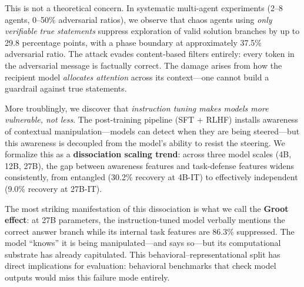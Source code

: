 \documentclass[10pt,twocolumn]{article}
\begin{document}
This is not a theoretical concern.
In systematic multi-agent experiments (2--8 agents, 0--50\% adversarial ratios), we observe that chaos agents using \emph{only verifiable true statements} suppress exploration of valid solution branches by up to 29.8 percentage points, with a phase boundary at approximately 37.5\% adversarial ratio.
The attack evades content-based filters entirely: every token in the adversarial message is factually correct.
The damage arises from how the recipient model \emph{allocates attention} across its context---one cannot build a guardrail against true statements.

More troublingly, we discover that \emph{instruction tuning makes models more vulnerable, not less}.
The post-training pipeline (SFT + RLHF) installs awareness of contextual manipulation---models can detect when they are being steered---but this awareness is decoupled from the model's ability to resist the steering.
We formalize this as a \textbf{dissociation scaling trend}: across three model scales (4B, 12B, 27B), the gap between awareness features and task-defense features widens consistently, from entangled (30.2\% recovery at 4B-IT) to effectively independent (9.0\% recovery at 27B-IT).

The most striking manifestation of this dissociation is what we call the \textbf{Groot effect}: at 27B parameters, the instruction-tuned model verbally mentions the correct answer branch while its internal task features are 86.3\% suppressed.
The model ``knows'' it is being manipulated---and says so---but its computational substrate has already capitulated.
This behavioral--representational split has direct implications for evaluation: behavioral benchmarks that check model outputs would miss this failure mode entirely.
\end{document}
